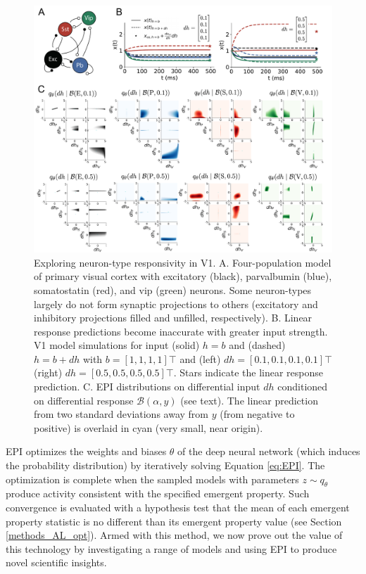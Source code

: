 \documentclass[11pt]{article}
\begin{document}
\begin{figure}
\begin{center}
\includegraphics[scale=0.55]{figures/fig2/fig2.pdf}
\end{center}
\caption{Exploring neuron-type responsivity in V1.  A. Four-population model of primary visual cortex with excitatory (black), parvalbumin (blue), somatostatin (red), and vip (green) neurons.   Some neuron-types largely do not form synaptic projections to others  (excitatory and inhibitory projections filled and unfilled, respectively).  B. Linear response predictions become inaccurate with greater input strength.  V1 model simulations for input (solid) $h=b$ and (dashed) $h = b + dh$ with $b = \left[1, 1, 1, 1\right]\top$ and (left) $dh = \left[0.1, 0.1, 0.1, 0.1\right]\top$ (right) $dh = \left[0.5, 0.5, 0.5, 0.5\right]\top$.  Stars indicate the linear response prediction.  C. EPI distributions on differential input $dh$ conditioned on differential response $\mathcal{B}(\alpha, y)$ (see text). The linear prediction from two standard deviations away from $y$ (from negative to positive) is overlaid in cyan (very small, near origin). }
\end{figure}

EPI optimizes the weights and biases $\theta$ of the deep neural network (which induces the probability distribution) by iteratively solving Equation \ref{eq:EPI}. The optimization is complete when the sampled models with parameters $z \sim q_\theta$ produce activity consistent with the specified emergent property.  Such convergence is evaluated with a hypothesis test that the mean of each emergent property statistic is no different than its emergent property value (see Section \ref{methods_AL_opt}). Armed with this method, we now prove out the value of this technology by investigating a range of models and using EPI to produce novel scientific insights.
\end{document}
